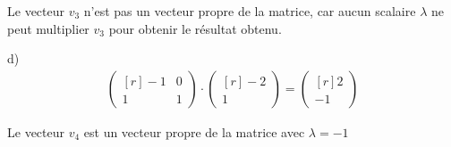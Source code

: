 Le vecteur $v_3$ n'est pas un vecteur propre de la matrice, car aucun scalaire
$\lambda$ ne peut multiplier $v_3$ pour obtenir le résultat obtenu.

d) 
\begin{align*}
   \begin{pmatrix*}[r] 
   -1 & 0 \\
    1 & 1
   \end{pmatrix*}
   \cdot
   \begin{pmatrix*}[r] 
   -2 \\
   1
   \end{pmatrix*}
   =
   \begin{pmatrix*}[r] 
     2 \\
    -1 
   \end{pmatrix*}
\end{align*}

Le vecteur $v_4$ est un vecteur propre de la matrice avec $\lambda = -1$
